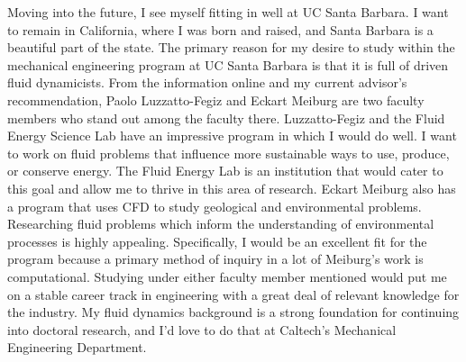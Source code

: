 \documentclass{article}
\begin{document}
Moving into the future, I see myself fitting in well at UC Santa Barbara. I want to remain in California, where I was born and raised, and Santa Barbara is a beautiful part of the state. The primary reason for my desire to study within the mechanical engineering program at UC Santa Barbara is that it is full of driven fluid dynamicists. From the information online and my current advisor's recommendation, Paolo Luzzatto-Fegiz and Eckart Meiburg are two faculty members who stand out among the faculty there. Luzzatto-Fegiz and the Fluid Energy Science Lab have an impressive program in which I would do well. I want to work on fluid problems that influence more sustainable ways to use, produce, or conserve energy. The Fluid Energy Lab is an institution that would cater to this goal and allow me to thrive in this area of research. Eckart Meiburg also has a program that uses CFD to study geological and environmental problems. Researching fluid problems which inform the understanding of environmental processes is highly appealing. Specifically, I would be an excellent fit for the program because a primary method of inquiry in a lot of Meiburg's work is computational. Studying under either faculty member mentioned would put me on a stable career track in engineering with a great deal of relevant knowledge for the industry. My fluid dynamics background is a strong foundation for continuing into doctoral research, and I'd love to do that at Caltech's Mechanical Engineering Department.
\end{document}
